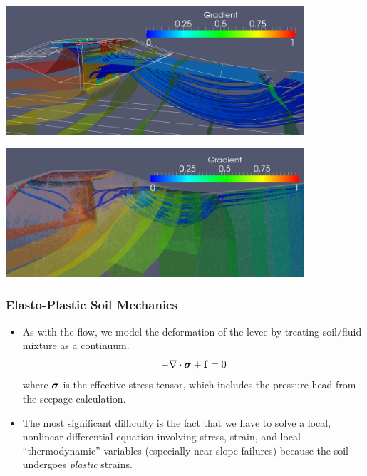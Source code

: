 \documentclass{beamer}
\begin{document}
\begin{frame}
\end{frame}

\begin{frame}
\includegraphics[width=4.35in]{pocketLevee_nopipe.png}
\end{frame}

\begin{frame}
\includegraphics[width=4.35in]{pocketLevee3d_pipe.png}
\end{frame}

\begin{frame}
  \frametitle{Elasto-Plastic Soil Mechanics}
  \begin{itemize}
    \item As with the flow, we model the deformation of the levee by
      treating soil/fluid mixture as a continuum.
      \begin{equation}
        - \nabla \cdot \mbox{{\boldmath ${\sigma}$}}  + {\bf f} = 0
      \end{equation}
      where $\mbox{{\boldmath ${\sigma}$}}$ is the effective stress tensor, which includes the pressure head from the seepage calculation.
    \item The most significant difficulty is the fact that we have to
      solve a local, nonlinear differential equation involving stress,
      strain, and local ``thermodynamic'' variables (especially near
      slope failures) because the soil undergoes {\em plastic}
      strains.
  \end{itemize}
\end{frame}
\end{document}
